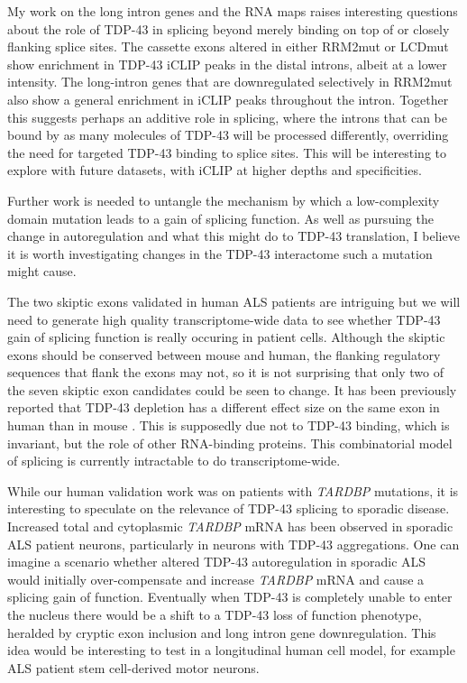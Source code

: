  My work on the long intron genes and the RNA maps raises interesting questions about the role of TDP-43 in splicing beyond merely binding on top of or closely flanking splice sites. 
 The cassette exons altered in either RRM2mut or LCDmut show enrichment in TDP-43 iCLIP peaks in the distal introns, albeit at a lower intensity. 
 The long-intron genes that are downregulated selectively in RRM2mut also show a general enrichment in iCLIP peaks throughout the intron. 
 Together this suggests perhaps an additive role in splicing, where the introns that can be bound by as many molecules of TDP-43 will be processed differently, overriding the need for targeted TDP-43 binding to splice sites.
 This will be interesting to explore with future datasets, with iCLIP at higher depths and specificities. 
 
 Further work is needed to untangle the mechanism by which a low-complexity domain mutation leads to a gain of splicing function.
 As well as pursuing the change in autoregulation and what this might do to TDP-43 translation, I believe it is worth investigating changes in the TDP-43 interactome such a mutation might cause.
 
 The two skiptic exons validated in human ALS patients are intriguing but we will need to generate high quality transcriptome-wide data to see whether TDP-43 gain of splicing function is really occuring in patient cells.
 Although the skiptic exons should be conserved between mouse and human, the flanking regulatory sequences that flank the exons may not, so it is not surprising that only two of the seven skiptic exon candidates could be seen to change. It has been previously reported that TDP-43 depletion has a different effect size on the same exon in human than in mouse \cite{Mohagheghi2016}. 
 This is supposedly due not to TDP-43 binding, which is invariant, but the role of other RNA-binding proteins.
This combinatorial model of splicing is currently intractable to do transcriptome-wide. %
 
 While our human validation work was on patients with \textit{TARDBP} mutations, it is interesting to speculate on the relevance of TDP-43 splicing to sporadic disease. 
 Increased total and cytoplasmic \textit{TARDBP} mRNA has been observed in sporadic ALS patient neurons, particularly in neurons with TDP-43 aggregations.
 One can imagine a scenario whether altered TDP-43 autoregulation in sporadic ALS would initially over-compensate and increase \textit{TARDBP} mRNA and cause a splicing gain of function.
 Eventually when TDP-43 is completely unable to enter the nucleus there would be a shift to a TDP-43 loss of function phenotype, heralded by cryptic exon inclusion and long intron gene downregulation.  
 This idea would be interesting to test in a longitudinal human cell model, for example ALS patient stem cell-derived motor neurons.
 

